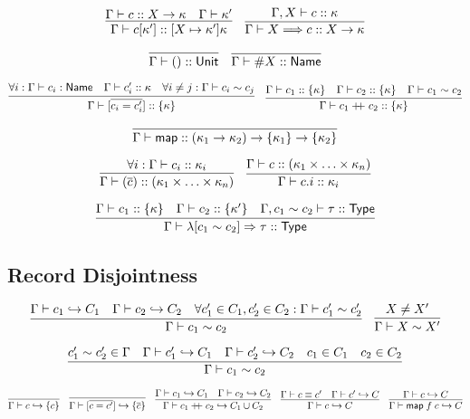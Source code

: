 \documentclass{article}
\newcommand{\mt}[1]{\mathsf{#1}}
\newcommand{\rc}{+ \hspace{-.075in} + \;}
\begin{document}
$$\infer{\Gamma \vdash c[\kappa'] :: [X \mapsto \kappa']\kappa}{
  \Gamma \vdash c :: X \to \kappa
  & \Gamma \vdash \kappa'
}
\quad \infer{\Gamma \vdash X \Longrightarrow c :: X \to \kappa}{
  \Gamma, X \vdash c :: \kappa
}$$

$$\infer{\Gamma \vdash () :: \mt{Unit}}{}
\quad \infer{\Gamma \vdash \#X :: \mt{Name}}{}$$

$$\infer{\Gamma \vdash [\overline{c_i = c'_i}] :: \{\kappa\}}{
  \forall i: \Gamma \vdash c_i : \mt{Name}
  & \Gamma \vdash c'_i :: \kappa
  & \forall i \neq j: \Gamma \vdash c_i \sim c_j
}
\quad \infer{\Gamma \vdash c_1 \rc c_2 :: \{\kappa\}}{
  \Gamma \vdash c_1 :: \{\kappa\}
  & \Gamma \vdash c_2 :: \{\kappa\}
  & \Gamma \vdash c_1 \sim c_2
}$$

$$\infer{\Gamma \vdash \mt{map} :: (\kappa_1 \to \kappa_2) \to \{\kappa_1\} \to \{\kappa_2\}}{}$$

$$\infer{\Gamma \vdash (\overline c) :: (\kappa_1 \times \ldots \times \kappa_n)}{
  \forall i: \Gamma \vdash c_i :: \kappa_i
}
\quad \infer{\Gamma \vdash c.i :: \kappa_i}{
  \Gamma \vdash c :: (\kappa_1 \times \ldots \times \kappa_n)
}$$

$$\infer{\Gamma \vdash \lambda [c_1 \sim c_2] \Rightarrow \tau :: \mt{Type}}{
  \Gamma \vdash c_1 :: \{\kappa\}
  & \Gamma \vdash c_2 :: \{\kappa'\}
  & \Gamma, c_1 \sim c_2 \vdash \tau :: \mt{Type}
}$$

\subsection{Record Disjointness}

$$\infer{\Gamma \vdash c_1 \sim c_2}{
  \Gamma \vdash c_1 \hookrightarrow C_1
  & \Gamma \vdash c_2 \hookrightarrow C_2
  & \forall c'_1 \in C_1, c'_2 \in C_2: \Gamma \vdash c'_1 \sim c'_2
}
\quad \infer{\Gamma \vdash X \sim X'}{
  X \neq X'
}$$

$$\infer{\Gamma \vdash c_1 \sim c_2}{
  c'_1 \sim c'_2 \in \Gamma
  & \Gamma \vdash c'_1 \hookrightarrow C_1
  & \Gamma \vdash c'_2 \hookrightarrow C_2
  & c_1 \in C_1
  & c_2 \in C_2
}$$

$$\infer{\Gamma \vdash c \hookrightarrow \{c\}}{}
\quad \infer{\Gamma \vdash [\overline{c = c'}] \hookrightarrow \{\overline{c}\}}{}
\quad \infer{\Gamma \vdash c_1 \rc c_2 \hookrightarrow C_1 \cup C_2}{
  \Gamma \vdash c_1 \hookrightarrow C_1
  & \Gamma \vdash c_2 \hookrightarrow C_2
}
\quad \infer{\Gamma \vdash c \hookrightarrow C}{
  \Gamma \vdash c \equiv c'
  & \Gamma \vdash c' \hookrightarrow C
}
\quad \infer{\Gamma \vdash \mt{map} \; f \; c \hookrightarrow C}{
  \Gamma \vdash c \hookrightarrow C
}$$
\end{document}
